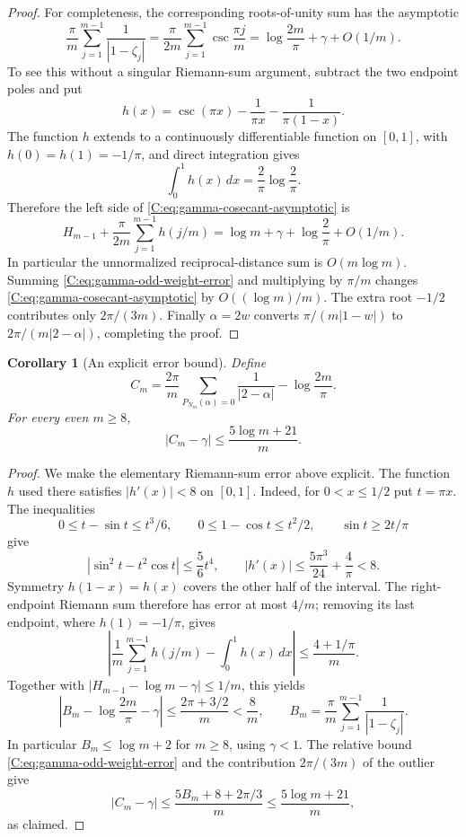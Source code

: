 \documentclass[11pt,a4paper]{article}
\newtheorem{corollary}[theorem]{Corollary}
\theoremstyle{definition}
\theoremstyle{remark}
\numberwithin{equation}{section}
\begin{document}
\begin{proof}
For completeness, the corresponding roots-of-unity sum has the asymptotic
\begin{equation}\label{C:eq:gamma-cosecant-asymptotic}
 \frac\pi m\sum_{j=1}^{m-1}\frac1{|1-\zeta_j|}
 =\frac\pi{2m}\sum_{j=1}^{m-1}\csc\frac{\pi j}{m}
 =\log\frac{2m}{\pi}+\gamma+O(1/m).
\end{equation}
To see this without a singular Riemann-sum argument, subtract the two
endpoint poles and put
\[
 h(x)=\csc(\pi x)-\frac1{\pi x}-\frac1{\pi(1-x)}.
\]
The function $h$ extends to a continuously differentiable function on
$[0,1]$, with $h(0)=h(1)=-1/\pi$, and direct integration gives
\[
 \int_0^1h(x)\,dx=\frac2\pi\log\frac2\pi.
\]
Therefore the left side of \eqref{C:eq:gamma-cosecant-asymptotic} is
\[
 H_{m-1}+\frac\pi{2m}\sum_{j=1}^{m-1}h(j/m)
 =\log m+\gamma+\log\frac2\pi+O(1/m).
\]
In particular the unnormalized reciprocal-distance sum is $O(m\log m)$.
Summing \eqref{C:eq:gamma-odd-weight-error} and multiplying by $\pi/m$
changes \eqref{C:eq:gamma-cosecant-asymptotic} by
$O((\log m)/m)$. The extra root $-1/2$ contributes only $2\pi/(3m)$.
Finally $\alpha=2w$ converts $\pi/(m|1-w|)$ to
$2\pi/(m|2-\alpha|)$, completing the proof.
\end{proof}

\begin{corollary}[An explicit error bound]
Define
\[
 C_m=\frac{2\pi}{m}\sum_{P_{N_m}(\alpha)=0}\frac1{|2-\alpha|}
          -\log\frac{2m}{\pi}.
\]
For every even $m\ge8$,
\[
 \boxed{\quad |C_m-\gamma|\le\frac{5\log m+21}{m}.\quad}
\]
\end{corollary}
\begin{proof}
We make the elementary Riemann-sum error above explicit. The function
$h$ used there satisfies $|h'(x)|<8$ on $[0,1]$. Indeed, for
$0<x\le1/2$ put $t=\pi x$. The inequalities
\[
 0\le t-\sin t\le t^3/6,\qquad
 0\le1-\cos t\le t^2/2,\qquad \sin t\ge2t/\pi
\]
give
\[
 |\sin^2t-t^2\cos t|\le\frac56t^4,
 \qquad
 |h'(x)|
 \le\frac{5\pi^3}{24}+\frac4\pi<8.
\]
Symmetry $h(1-x)=h(x)$ covers the other half of the interval.
The right-endpoint Riemann sum therefore has error at most $4/m$;
removing its last endpoint, where $h(1)=-1/\pi$, gives
\[
 \left|\frac1m\sum_{j=1}^{m-1}h(j/m)-\int_0^1h(x)\,dx\right|
 \le\frac{4+1/\pi}{m}.
\]
Together with
$|H_{m-1}-\log m-\gamma|\le1/m$, this yields
\[
 \left|B_m-\log\frac{2m}{\pi}-\gamma\right|
 \le\frac{2\pi+3/2}{m}<\frac8m,
 \qquad
 B_m=\frac\pi m\sum_{j=1}^{m-1}\frac1{|1-\zeta_j|}.
\]
In particular $B_m\le\log m+2$ for $m\ge8$, using $\gamma<1$.
The relative bound \eqref{C:eq:gamma-odd-weight-error} and the contribution
$2\pi/(3m)$ of the outlier give
\[
 |C_m-\gamma|
 \le\frac{5B_m+8+2\pi/3}{m}
 \le\frac{5\log m+21}{m},
\]
as claimed.
\end{proof}
\end{document}
